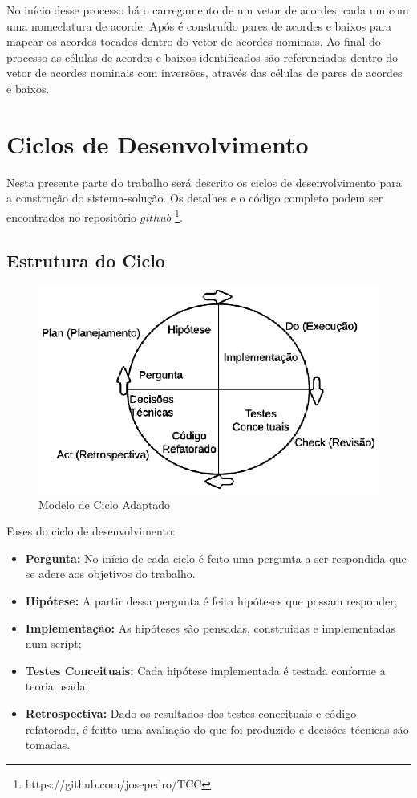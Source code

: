No início desse processo há o carregamento de um vetor de acordes, cada um com uma nomeclatura de acorde. Após é construído pares de acordes e baixos para mapear os acordes tocados dentro do vetor de acordes nominais. Ao final do processo as células de acordes e baixos identificados são referenciados dentro do vetor de acordes nominais com inversões, através das células de pares de acordes e baixos.



\section {Ciclos de Desenvolvimento}
 
Nesta presente parte do trabalho será descrito os ciclos de desenvolvimento para a construção do sistema-solução. Os detalhes e o código completo podem ser encontrados no repositório $github$ \footnote{https://github.com/josepedro/TCC}.

\subsection{Estrutura do Ciclo}

\begin{figure}[h] 
  \centering
    \includegraphics[keepaspectratio=true, scale=0.85]{figuras/ciclo_desenvolvimento}
    \caption{Modelo de Ciclo Adaptado}
\end{figure}

Fases do ciclo de desenvolvimento:
\begin{itemize}
\item \textbf{Pergunta:} No início de cada ciclo é feito uma pergunta a ser respondida que se adere aos objetivos do trabalho.
\item \textbf{Hipótese:} A partir dessa pergunta é feita hipóteses que possam responder;
\item \textbf{Implementação:} As hipóteses são pensadas, construidas e implementadas num script;
\item \textbf{Testes Conceituais:} Cada hipótese implementada é testada conforme a teoria usada;
\item \textbf{Retrospectiva:} Dado os resultados dos testes conceituais e código refatorado, é feitto uma avaliação do que foi produzido e decisões técnicas são tomadas.
\end{itemize}
  
